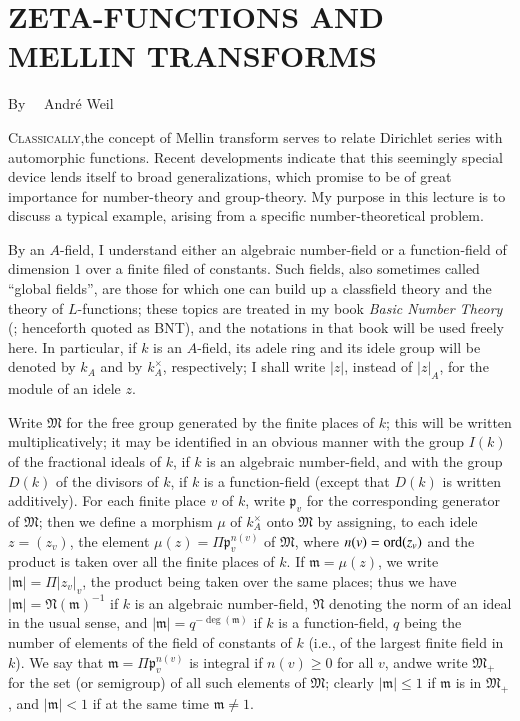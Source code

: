 \chapter[\textsc{A. Weil~:} Zeta-Functions and Mellin Transforms]{ZETA-FUNCTIONS AND MELLIN TRANSFORMS}\label{art21}

\begin{center}
By~~ Andr\'e Weil
\end{center}

\setcounter{pageoriginal}{408}
\textsc{Classically,}\pageoriginale the concept of Mellin transform serves to relate Dirichlet series with automorphic functions. Recent developments indicate that this seemingly special device lends itself to broad generalizations, which promise to be of great importance for number-theory and group-theory. My purpose in this lecture is to discuss a typical example, arising from a specific number-theoretical problem.

By an $A$-field, I understand either an algebraic number-field or a function-field of dimension $1$ over a finite filed of constants. Such fields, also sometimes called ``global fields'', are those for which one can build up a classfield theory and the theory of $L$-functions; these topics are treated in my book {\em Basic Number Theory} (\cite{art21-key3}; henceforth quoted as BNT), and the notations in that book will be used freely here. In particular, if $k$ is an $A$-field, its adele ring and its idele group will be denoted by $k_{A}$ and by $k^{\times}_{A}$, respectively; I shall write $|z|$, instead of $|z|_{A}$, for the module of an idele $z$.

Write $\mathfrak{M}$ for the free group generated by the finite places of $k$; this will be written multiplicatively; it may be identified in an obvious manner with the group $I(k)$ of the fractional ideals of $k$, if $k$ is an algebraic number-field, and with the group $D(k)$ of the divisors of $k$, if $k$ is a function-field (except that $D(k)$ is written additively). For each finite place $v$ of $k$, write $\mathfrak{p}_{v}$ for the corresponding generator of $\mathfrak{M}$; then we define a morphism $\mu$ of $k^{\times}_{A}$ onto $\mathfrak{M}$ by assigning, to each idele $z=(z_{v})$, the element $\mu(z)=\Pi \mathfrak{p}^{n(v)}_{v}$ of $\mathfrak{M}$, where $n(v)=\operatorname{\mathrm{ord}} (z_{v})$ and the product is taken over all the finite places of $k$. If $\mathfrak{m}=\mu(z)$, we write $|\mathfrak{m}|=\Pi |z_{v}|_{v}$, the product being taken over the same places; thus we have $|\mathfrak{m}|=\mathfrak{N}(\mathfrak{m})^{-1}$ if $k$ is an algebraic number-field, $\mathfrak{N}$ denoting the norm of an ideal in the usual sense, and $|\mathfrak{m}|=q^{-\deg(\mathfrak{m})}$ if $k$ is a function-field, $q$ being the number of elements of the field of constants of $k$ (i.e., of the largest finite field in $k$). We say that $\mathfrak{m}=\Pi \mathfrak{p}^{n(v)}_{v}$ is integral if $n(v)\geq 0$ for all $v$, and\pageoriginale we write $\mathfrak{M}_{+}$ for the set (or semigroup) of all such elements of $\mathfrak{M}$; clearly $|\mathfrak{m}|\leq 1$ if $\mathfrak{m}$ is in $\mathfrak{M}_{+}$, and $|\mathfrak{m}|<1$ if at the same time $\mathfrak{m}\neq 1$.

